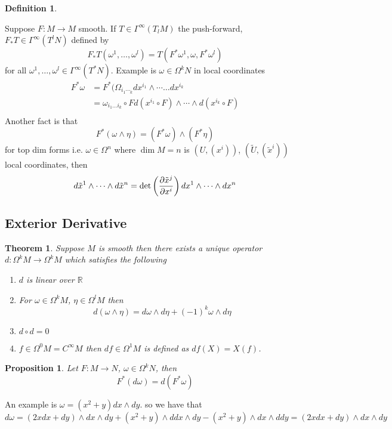 \documentclass[a4paper]{article}
\newtheorem*{prop}{Proposition}
\newtheorem*{defn}{Definition}
\newtheorem*{thm}{Theorem}
\begin{document}
\begin{defn}
\end{defn}
  Suppose $F: M \rightarrow M$ smooth. If $T \in \Gamma^\infty(T_lM)$ the push-forward, $F_* T \in \Gamma^\infty(T^lN)$ defined by 
  \[
    F_*T(\omega^1, \dots, \omega^l) = T(F^*\omega^1, \omega, F^*\omega^l)
  \]
  for all $\omega^1, \dots, \omega^l \in \Gamma^\infty(T^*N)$.
Example is $\omega \in \Omega^kN$ in local coordinates
\[
  \begin{aligned}
    F^*\omega &= F^*(\Omega_{i_1\dotsi_k} dx^{i_1} \wedge \cdots \dots dx^{i_k} \\
              &= \omega_{i_1 \dots i_k} \circ F d(x^{i_1} \circ F) \wedge \cdots \wedge d(x^{i_k} \circ F) \\
  \end{aligned}
\]
Another fact is that
\[
  F^*(\omega \wedge \eta) = (F^*\omega) \wedge (F^*\eta)
\]
for top dim forms i.e. $\omega \in \Omega^n$ where $\dim M = n$ is $(U, (x^i))$, $(\tilde{U}, (\tilde{x}^i))$ local coordinates, then
\[
  d\tilde{x}^1 \wedge \dots \wedge d\tilde{x}^n = \det\left( \pdv{\tilde{x}^j}{x^i}\right) dx^1 \wedge \cdots \wedge dx^n
\]

\subsection*{Exterior Derivative}%

\begin{thm}
  Suppose $M$ is smooth then there exists a unique operator $d: \Omega^kM \rightarrow \Omega^{k}M$ which satisfies the following 
  \begin{enumerate}
    \item $d$ is linear over $\mathds{R}$
    \item For $\omega \in \Omega^kM$, $\eta \in \Omega^lM$ then
      \[
        d(\omega \wedge \eta) = d\omega \wedge d\eta + (-1)^k \omega \wedge d\eta
      \]
    \item $d \circ d = 0$
    \item $f \in \Omega^0M = C^\infty M$ then $df \in \Omega^1M$ is defined as $df(X) = X(f)$.
  \end{enumerate}
\end{thm}

\begin{prop}
 Let $F: M \rightarrow N$, $\omega \in \Omega^kN$, then 
 \[
   F^*(d\omega) = d(F^*\omega)
 \]
\end{prop}

An example is $\omega = (x^2 + y) dx \wedge dy$. so we have that
\[
  d\omega = (2x dx + dy) \wedge dx \wedge dy + (x^2 + y) \wedge ddx \wedge dy - (x^2 + y) \wedge dx \wedge ddy = (2x dx + dy) \wedge dx \wedge dy
\]
\end{document}
